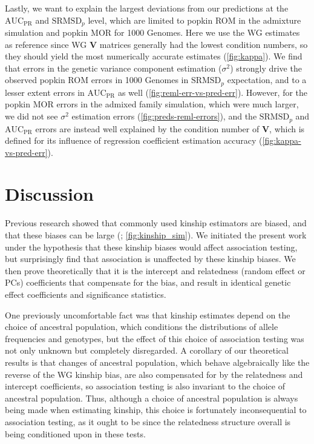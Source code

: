 \documentclass[11pt]{article}
\newcommand{\rmsd}{\text{SRMSD}_p}
\newcommand{\auc}{\text{AUC}_\text{PR}}
\begin{document}
Lastly, we want to explain the largest deviations from our predictions at the $\auc$ and $\rmsd$ level, which are limited to popkin ROM in the admixture simulation and popkin MOR for 1000 Genomes.
Here we use the WG estimates as reference since WG $\mathbf{V}$ matrices generally had the lowest condition numbers, so they should yield the most numerically accurate estimates (\cref{fig:kappa}).
We find that errors in the genetic variance component estimation ($\sigma^2$) strongly drive the observed popkin ROM errors in 1000 Genomes in $\rmsd$ expectation, and to a lesser extent errors in $\auc$ as well (\cref{fig:reml-err-vs-pred-err}).
However, for the popkin MOR errors in the admixed family simulation, which were much larger, we did not see $\sigma^2$ estimation errors (\cref{fig:preds-reml-errors}), and the $\rmsd$ and $\auc$ errors are instead well explained by the condition number of $\mathbf{V}$, which is defined for its influence of regression coefficient estimation accuracy (\cref{fig:kappa-vs-pred-err}).

\section{Discussion}

Previous research showed that commonly used kinship estimators are biased, and that these biases can be large (\citet{ochoa_estimating_2021}; \cref{fig:kinship_sim}).
We initiated the present work under the hypothesis that these kinship biases would affect association testing, but surprisingly find that association is unaffected by these kinship biases.
We then prove theoretically that it is the intercept and relatedness (random effect or PCs) coefficients that compensate for the bias, and result in identical genetic effect coefficients and significance statistics.

One previously uncomfortable fact was that kinship estimates depend on the choice of ancestral population, which conditions the distributions of allele frequencies and genotypes, but the effect of this choice of association testing was not only unknown but completely disregarded.
A corollary of our theoretical results is that changes of ancestral population, which behave algebraically like the reverse of the WG kinship bias, are also compensated for by the relatedness and intercept coefficients, so association testing is also invariant to the choice of ancestral population.
Thus, although a choice of ancestral population is always being made when estimating kinship, this choice is fortunately inconsequential to association testing, as it ought to be since the relatedness structure overall is being conditioned upon in these tests.
\end{document}
